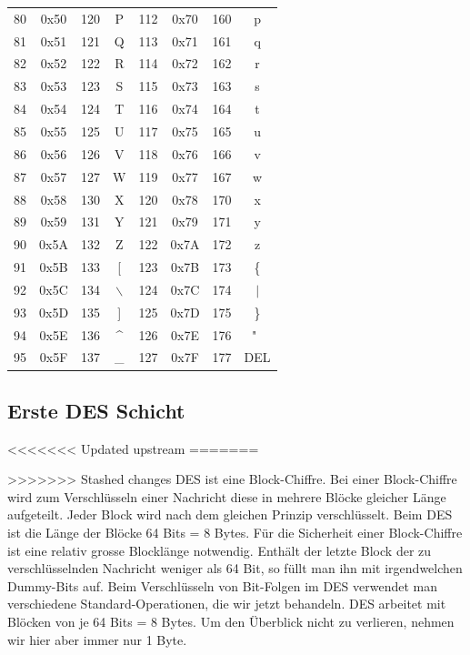 \documentclass[%
<<<<<<< Updated upstream
11pt,%
twoside,%
titlepage,%
german,%
headsepline%
]{scrartcl}
\begin{document}
\begin{longtable}{|c|c|c|c||c|c|c|c|}
80 & 0x50 & 120 & P & 112 & 0x70 & 160 & p \\
81 & 0x51 & 121 & Q & 113 & 0x71 & 161 & q \\
82 & 0x52 & 122 & R & 114 & 0x72 & 162 & r \\
83 & 0x53 & 123 & S & 115 & 0x73 & 163 & s \\
84 & 0x54 & 124 & T & 116 & 0x74 & 164 & t \\
85 & 0x55 & 125 & U & 117 & 0x75 & 165 & u \\
86 & 0x56 & 126 & V & 118 & 0x76 & 166 & v \\
87 & 0x57 & 127 & W & 119 & 0x77 & 167 & w \\
88 & 0x58 & 130 & X & 120 & 0x78 & 170 & x \\
89 & 0x59 & 131 & Y & 121 & 0x79 & 171 & y \\
90 & 0x5A & 132 & Z & 122 & 0x7A & 172 & z \\
91 & 0x5B & 133 & [ & 123 & 0x7B & 173 & \{ \\
92 & 0x5C & 134 & $\backslash$ & 124 & 0x7C & 174 &$\mid$\\
93 & 0x5D & 135 & ] & 125 & 0x7D & 175 & \} \\
94 & 0x5E & 136 & \^{} & 126 & 0x7E & 176 & "~ \\
95 & 0x5F & 137 & \_ & 127 & 0x7F & 177 & DEL \\
\hline
\end{longtable}

\subsection{Erste DES Schicht}
<<<<<<< Updated upstream
=======

>>>>>>> Stashed changes
DES ist eine Block-Chiffre. Bei einer Block-Chiffre wird zum Verschlüsseln einer Nachricht diese in mehrere Blöcke gleicher Länge aufgeteilt. Jeder Block wird nach dem gleichen Prinzip verschlüsselt.
Beim DES ist die Länge der Blöcke 64 Bits = 8 Bytes.
Für die Sicherheit einer Block-Chiffre ist eine relativ grosse Blocklänge notwendig.
Enthält der letzte Block der zu verschlüsselnden Nachricht weniger als 64 Bit, so füllt man ihn mit irgendwelchen Dummy-Bits auf.
Beim Verschlüsseln von Bit-Folgen im DES verwendet man verschiedene Standard-Operationen, die wir jetzt behandeln. 
DES arbeitet mit Blöcken von je 64 Bits = 8 Bytes. Um den Überblick nicht zu verlieren, nehmen wir hier aber immer nur 1 Byte.
\end{document}
